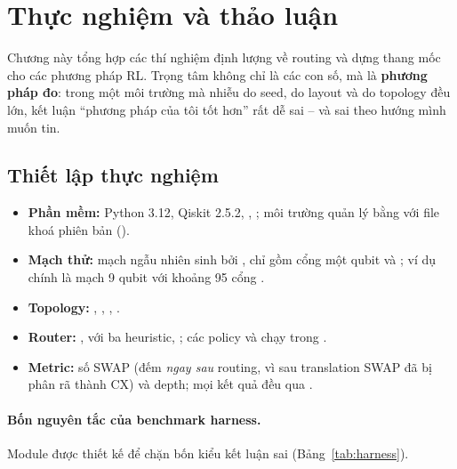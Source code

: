 \section{Thực nghiệm và thảo luận}
\label{sec:experiments}

Chương này tổng hợp các thí nghiệm định lượng về routing và dựng thang mốc cho các phương pháp RL.
Trọng tâm không chỉ là các con số, mà là \textbf{phương pháp đo}: trong một môi trường mà nhiễu do
seed, do layout và do topology đều lớn, kết luận ``phương pháp của tôi tốt hơn'' rất dễ sai -- và sai
theo hướng mình muốn tin.

\subsection{Thiết lập thực nghiệm}

\begin{itemize}[noitemsep]
  \item \textbf{Phần mềm:} Python 3.12, Qiskit 2.5.2, , ; môi
    trường quản lý bằng  với file khoá phiên bản ().
  \item \textbf{Mạch thử:} mạch ngẫu nhiên sinh bởi , chỉ gồm cổng một
    qubit và \cx{}; ví dụ chính là mạch 9 qubit với khoảng 95 cổng \cx{}.
  \item \textbf{Topology:} , , , .
  \item \textbf{Router:} ,  với ba heuristic, ;
    các policy  và  chạy trong .
  \item \textbf{Metric:} số SWAP (đếm \emph{ngay sau} routing, vì sau translation SWAP đã bị phân rã
    thành CX) và depth; mọi kết quả đều qua .
\end{itemize}

\paragraph{Bốn nguyên tắc của benchmark harness.} Module  được thiết kế để chặn bốn
kiểu kết luận sai (Bảng~\ref{tab:harness}).

